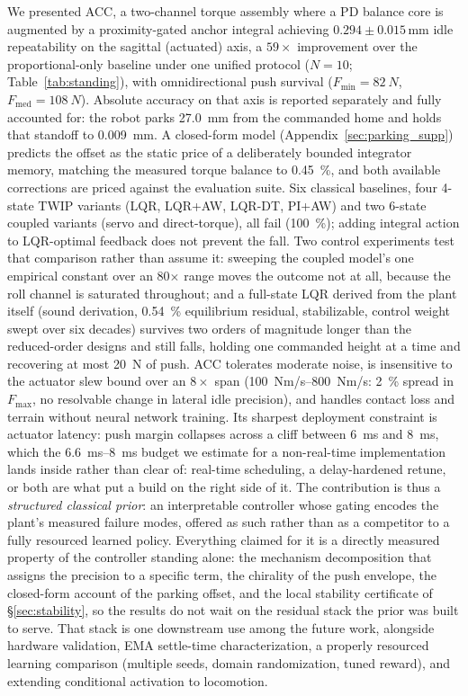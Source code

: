 \documentclass[conference]{IEEEtran}
\begin{document}
We presented ACC, a two-channel torque assembly where a PD balance core is augmented by a proximity-gated anchor integral achieving $0.294{\pm}0.015$\,mm idle repeatability on the sagittal (actuated) axis, a $59{\times}$ improvement over the proportional-only baseline under one unified protocol ($N{=}10$; Table~\ref{tab:standing}), with omnidirectional push survival ($F_{\min}{=}\SI{82}{N}$, $F_{\text{med}}{=}\SI{108}{N}$). Absolute accuracy on that axis is reported separately and fully accounted for: the robot parks \SI{27.0}{mm} from the commanded home and holds that standoff to \SI{0.009}{mm}. A closed-form model (Appendix~\ref{sec:parking_supp}) predicts the offset as the static price of a deliberately bounded integrator memory, matching the measured torque balance to \SI{0.45}{\percent}, and both available corrections are priced against the evaluation suite.
Six classical baselines, four 4-state TWIP variants (LQR, LQR+AW, LQR-DT, PI+AW) and two 6-state coupled variants (servo and direct-torque), all fail (\SI{100}{\percent}); adding integral action to LQR-optimal feedback does not prevent the fall. Two control experiments test that comparison rather than assume it: sweeping the coupled model's one empirical constant over an \num{80}$\times$ range moves the outcome not at all, because the roll channel is saturated throughout; and a full-state LQR derived from the plant itself (sound derivation, \SI{0.54}{\percent} equilibrium residual, stabilizable, control weight swept over six decades) survives two orders of magnitude longer than the reduced-order designs and still falls, holding one commanded height at a time and recovering at most \SI{20}{N} of push.
ACC tolerates moderate noise, is insensitive to the actuator slew bound over an $8{\times}$ span (\SIrange{100}{800}{Nm/s}: \SI{2}{\percent} spread in $F_{\max}$, no resolvable change in lateral idle precision), and handles contact loss and terrain without neural network training. Its sharpest deployment constraint is actuator latency: push margin collapses across a cliff between \SI{6}{ms} and \SI{8}{ms}, which the \SIrange{6.6}{8}{ms} budget we estimate for a non-real-time implementation lands inside rather than clear of: real-time scheduling, a delay-hardened retune, or both are what put a build on the right side of it.
The contribution is thus a \emph{structured classical prior}: an interpretable controller whose gating encodes the plant's measured failure modes, offered as such rather than as a competitor to a fully resourced learned policy. Everything claimed for it is a directly measured property of the controller standing alone: the mechanism decomposition that assigns the precision to a specific term, the chirality of the push envelope, the closed-form account of the parking offset, and the local stability certificate of \S\ref{sec:stability}, so the results do not wait on the residual stack the prior was built to serve. That stack is one downstream use among the future work, alongside hardware validation, EMA settle-time characterization, a properly resourced learning comparison (multiple seeds, domain randomization, tuned reward), and extending conditional activation to locomotion.
\end{document}
